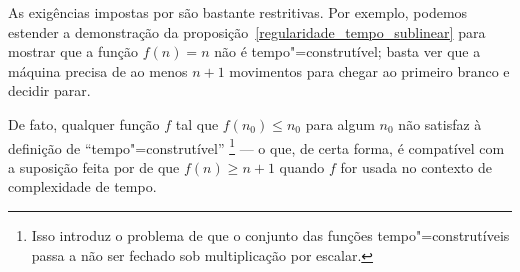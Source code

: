 As exigências impostas por 
são bastante restritivas.
Por exemplo,
podemos estender a demonstração da proposição~\ref{regularidade_tempo_sublinear}
para mostrar que a função $f(n) = n$
não é tempo"=construtível;
basta ver que a máquina precisa de ao menos $n+1$ movimentos
para chegar ao primeiro branco e decidir parar.

De fato, qualquer função $f$ tal que $f(n_0) \leq n_0$ para algum $n_0$
não satisfaz à definição de ``tempo"=construtível''
\footnote{
    Isso introduz o problema de que o conjunto das funções tempo"=construtíveis
    passa a não ser fechado sob multiplicação por escalar.
}
--- o que, de certa forma,
é compatível com a suposição feita por 
de que $f(n) \geq n+1$
quando $f$ for usada no contexto de complexidade de tempo.
